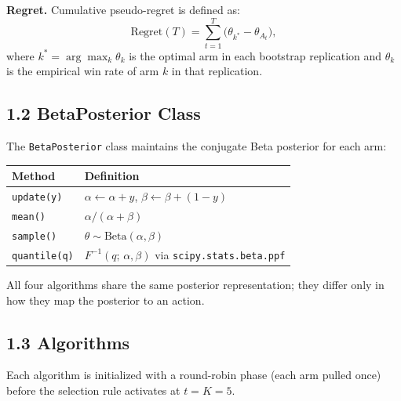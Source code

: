 \documentclass[11pt, letterpaper]{article}
\begin{document}
\textbf{Regret.} Cumulative pseudo-regret is defined as:
\[
  \text{Regret}(T) = \sum_{t=1}^{T} \bigl(\theta_{k^*} - \theta_{A_t}\bigr),
\]
where $k^* = \arg\max_k \theta_k$ is the optimal arm in each bootstrap replication and
$\theta_k$ is the empirical win rate of arm $k$ in that replication.


\subsection{1.2 BetaPosterior Class}

The \texttt{BetaPosterior} class maintains the conjugate Beta posterior for each arm:

\begin{center}
\begin{tabular}{ll}
\toprule
Method & Definition \\
\midrule
\texttt{update(y)} & $\alpha \leftarrow \alpha + y$, $\beta \leftarrow \beta + (1-y)$ \\
\texttt{mean()} & $\alpha / (\alpha + \beta)$ \\
\texttt{sample()} & $\theta \sim \text{Beta}(\alpha, \beta)$ \\
\texttt{quantile(q)} & $F^{-1}(q;\, \alpha, \beta)$ via \texttt{scipy.stats.beta.ppf} \\
\bottomrule
\end{tabular}
\end{center}

All four algorithms share the same posterior representation; they differ only in how they
map the posterior to an action.


\subsection{1.3 Algorithms}

Each algorithm is initialized with a round-robin phase (each arm pulled once) before the
selection rule activates at $t = K = 5$.
\end{document}
